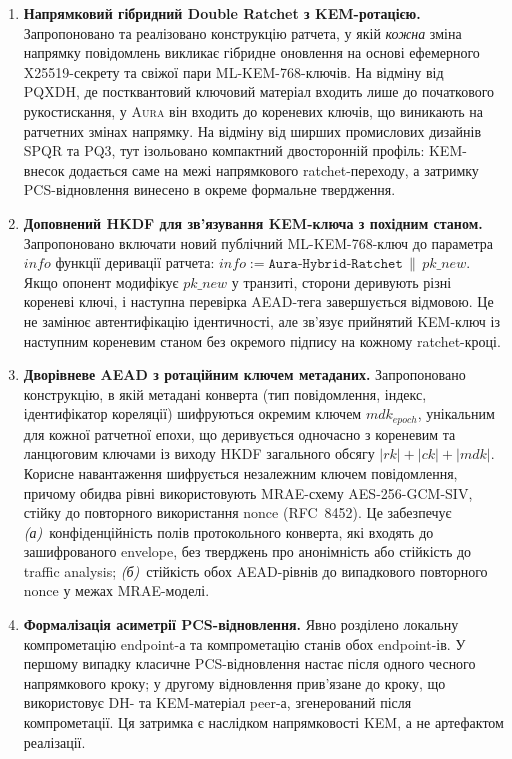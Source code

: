 \documentclass[11pt,a4paper]{article}
\theoremstyle{definition}
\newcommand{\AEAD}{\textsf{AES-256-GCM-SIV}}
\renewcommand{\DH}{\textsf{X25519}}
\newcommand{\KEM}{\textsf{ML-KEM-768}}
\newcommand{\concat}{\ensuremath{\,\|\,}}
\newcommand{\rk}{\ensuremath{\mathit{rk}}}
\newcommand{\ck}{\ensuremath{\mathit{ck}}}
\newcommand{\mdk}{\ensuremath{\mathit{mdk}}}
\newcommand{\epochv}{\ensuremath{\mathit{epoch}}}
\newcommand{\Aura}{\mbox{\normalfont\scshape Aura}}
\newcommand{\SPQR}{\textsf{SPQR}}
\newcommand{\PQThree}{\textsf{PQ3}}
\begin{document}
\begin{enumerate}
  \item[\textbf{Н1.}] \textbf{Напрямковий гібридний Double Ratchet з KEM-ротацією.}
    Запропоновано та реалізовано конструкцію ратчета,
    у якій \emph{кожна} зміна напрямку повідомлень викликає
    гібридне оновлення на основі ефемерного \DH{}-секрету та
    свіжої пари \KEM{}-ключів. На відміну від PQXDH, де постквантовий
    ключовий матеріал входить лише до початкового рукостискання, у \Aura{}
    він входить до кореневих ключів, що виникають на ратчетних змінах
    напрямку. На відміну від ширших промислових дизайнів \SPQR{} та
    \PQThree{}, тут ізольовано компактний двосторонній профіль: KEM-внесок
    додається саме на межі напрямкового ratchet-переходу, а затримку
    PCS-відновлення винесено в окреме формальне твердження.

  \item[\textbf{Н2.}] \textbf{Доповнений HKDF для зв'язування
    KEM-ключа з похідним станом.}
    Запропоновано включати новий публічний \KEM{}-ключ до параметра
    $\mathit{info}$ функції деривації ратчета:
    $\mathit{info} := \texttt{Aura-Hybrid-Ratchet} \concat \mathit{pk\_new}$.
    Якщо опонент модифікує $\mathit{pk\_new}$ у транзиті, сторони деривують
    різні кореневі ключі, і наступна перевірка AEAD-тега завершується
    відмовою. Це не замінює автентифікацію ідентичності, але зв'язує
    прийнятий KEM-ключ із наступним кореневим станом без окремого підпису на
    кожному ratchet-кроці.

  \item[\textbf{Н3.}] \textbf{Дворівневе AEAD з ротаційним ключем
    метаданих.}
    Запропоновано конструкцію, в якій метадані конверта
    (тип повідомлення, індекс, ідентифікатор кореляції) шифруються
    окремим ключем $\mdk_{\epochv}$, унікальним для кожної ратчетної
    епохи, що деривується одночасно з кореневим та ланцюговим ключами
    із виходу HKDF загального обсягу $|\rk| + |\ck| + |\mdk|$. Корисне
    навантаження шифрується незалежним ключем повідомлення, причому
    обидва рівні використовують MRAE-схему \AEAD{}, стійку до повторного
    використання nonce (RFC~8452). Це забезпечує \emph{(а)}~конфіденційність
    полів протокольного конверта, які входять до зашифрованого envelope, без
    тверджень про анонімність або стійкість до traffic analysis;
    \emph{(б)}~стійкість обох AEAD-рівнів до випадкового повторного nonce у
    межах MRAE-моделі.

  \item[\textbf{Н4.}] \textbf{Формалізація асиметрії PCS-відновлення.}
    Явно розділено локальну компрометацію endpoint-а та компрометацію
    станів обох endpoint-ів. У першому випадку класичне PCS-відновлення
    настає після одного чесного напрямкового кроку; у другому відновлення
    прив'язане до кроку, що використовує DH- та KEM-матеріал peer-а,
    згенерований після компрометації. Ця затримка є наслідком напрямковості
    KEM, а не артефактом реалізації.


\end{enumerate}
\end{document}
